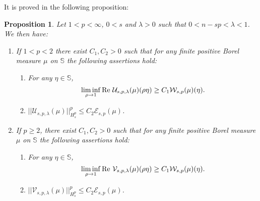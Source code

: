 \documentclass[12pt,twoside,leqno,final]{amsart}
\theoremstyle{plain}
\newtheorem{prop}[thm]{Proposition}
\begin{document}
It is   proved in \cite{cohnverbitsky} the following proposition:

 \begin{prop}\label{prop:pgreaterthan2}
  Let $1< p<\infty$, $0<s$ and $\lambda>0$ such that $0<n-sp<\lambda <1$. We then have:
  \begin{enumerate}
   \item If $1<p<2$   there exist $C_1,C_2>0$   such that for any    finite positive Borel measure $\mu$ on ${{\mathbb S}}$ the following assertions hold:
  \begin{enumerate}
  \item[(a)] For any $\eta\in {{\mathbb S}}$,
  $$\liminf_{\rho\rightarrow 1} {\rm Re}\,\, {\mathcal U}_{s,p,\lambda}(\mu)(\rho\eta)\geq C_1 {\mathcal W}_{s,p}(\mu)(\eta).$$
  \item[(b)] $|| {\mathcal U}_{s,p,\lambda}(\mu)||_{H_s^p }^p \leq C_2{\mathcal E}_{s,p} (\mu)$.
  \end{enumerate}
 
  \item If $p\geq 2$,  there exist $C_1,C_2>0$ such that for any  finite positive Borel measure $\mu$ on $ {{\mathbb S}}$ the following assertions hold: 
  \begin{enumerate}
  \item[a)] For any $\eta\in {{\mathbb S}}$,
  $$\liminf_{\rho\rightarrow 1} {\rm Re}\,\, {\mathcal V}_{s,p,\lambda}(\mu)(\rho\eta)\geq C_1 {\mathcal W}_{s,p} (\mu)(\eta).$$
  
  \item[b)] $|| {\mathcal V}_{s,p,\lambda}(\mu)||_{H_s^p }^p \leq C_2{\mathcal E}_{s,p} (\mu)$.
  \end{enumerate}
  \end{enumerate}
  \end{prop} 
\quad
\end{document}

